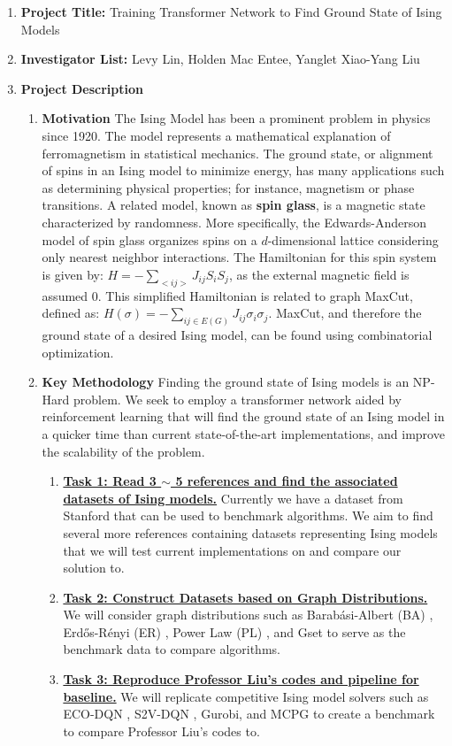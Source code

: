 \documentclass{article}
\begin{document}
\begin{enumerate}
\item \textbf{Project Title:} Training Transformer Network to Find Ground State of Ising Models

\item \textbf{Investigator List:} Levy Lin, Holden Mac Entee, Yanglet Xiao-Yang Liu

\item \textbf{Project Description}
\begin{enumerate}
	\item \textbf{Motivation}
	\newline
	The Ising Model has been a prominent problem in physics since 1920. The model represents a mathematical explanation of ferromagnetism in statistical mechanics. The ground state, or alignment of spins in an Ising model to minimize energy, has many applications such as determining physical properties; for instance, magnetism or phase transitions. A related model, known as \textbf{spin glass}, is a magnetic state characterized by randomness. More specifically, the Edwards-Anderson model of spin glass organizes spins on a $d$-dimensional lattice considering only nearest neighbor interactions. The Hamiltonian for this spin system is given by: $H = - \sum_{<ij>}J_{ij}S_iS_j$, as the external magnetic field is assumed 0. This simplified Hamiltonian is related to graph MaxCut, defined as: $H(\sigma) = - \sum_{ij\in E(G)}J_{ij}\sigma_i\sigma_j$. MaxCut, and therefore the ground state of a desired Ising model, can be found using combinatorial optimization.

	\item \textbf{Key Methodology}
	\newline
		Finding the ground state of Ising models is an NP-Hard problem. We seek to employ a transformer network aided by reinforcement learning that will find the ground state of an Ising model in a quicker time than current state-of-the-art implementations, and improve the scalability of the problem.
	\begin{enumerate}
			
		\item \textbf{\underline{Task 1: Read 3 $\sim$ 5 references and find the associated datasets of Ising models.}}
		\newline Currently we have a dataset from Stanford that can be used to benchmark algorithms. We aim to find several more references containing datasets representing Ising models that we will test current implementations on and compare our solution to.
		\item \textbf{\underline{Task 2: Construct Datasets based on Graph Distributions.}} We will consider graph distributions such as Barab\'asi-Albert (BA) \cite{b11}, Erd\H os-R\'enyi (ER) \cite{b8}, Power Law (PL) \cite{b9}, and Gset to serve as the benchmark data to compare algorithms.
		\item \textbf{\underline{Task 3: Reproduce Professor Liu's codes and pipeline for baseline.}}  We will replicate competitive Ising model solvers such as ECO-DQN \cite{b6}, S2V-DQN \cite{b7}, Gurobi, and MCPG \cite{b10} to create a benchmark to compare Professor Liu's codes to.


\end{enumerate}
\end{enumerate}
\end{enumerate}
\end{document}
